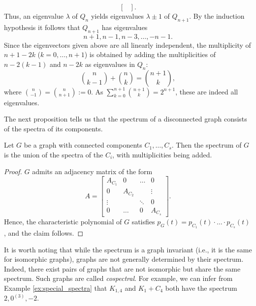 \begin{example}
\begin{enumerate}
\begin{equation*}
\begin{bmatrix}
                \end{bmatrix}.
            \end{equation*}
            Thus, an eigenvalue $\lambda$ of $Q_n$ yields eigenvalues $\lambda \pm 1$ of $Q_{n + 1}$.
            By the induction hypothesis it follows that $Q_{n + 1}$ has eigenvalues 
            \begin{equation*}
                n + 1, n - 1, n - 3, \dots, -n - 1.
            \end{equation*}
            Since the eigenvectors given above are all linearly independent, the multiplicity of $n + 1 - 2k$ ($k = 0, \dots, n + 1$) is obtained by adding the multiplicities of $n - 2(k - 1)$ and $n - 2k$ as eigenvalues in $Q_n$:
            \begin{equation*}
                \binom{n}{k - 1} + \binom{n}{k} = \binom{n + 1}{k},
            \end{equation*}
            where $\binom{n}{-1} = \binom{n}{n + 1} := 0$. As $\sum_{k = 0}^{n + 1} \binom{n + 1}{k} = 2^{n + 1}$, these are indeed all eigenvalues.
    \end{enumerate}
\end{example}

The next proposition tells us that the spectrum of a disconnected graph consists of the spectra of its components.
\begin{proposition}
    Let $G$ be a graph with connected components $C_1, \dots, C_s$. 
    Then the spectrum of $G$ is the union of the spectra of the $C_i$, with multiplicities being added.
\end{proposition}

\begin{proof}
    $G$ admits an adjacency matrix of the form
    \begin{equation*}
        A = \begin{bmatrix}
            A_{C_1} & 0 & \dots & 0 \\
            0 & A_{C_2} & & \vdots \\
            \vdots & & \ddots & 0 \\
            0 & \dots & 0 & A_{C_s}
        \end{bmatrix}.
    \end{equation*}
    Hence, the characteristic polynomial of $G$ satisfies $p_G (t) = p_{C_1} (t) \cdot \dots \cdot p_{C_s} (t)$, and the claim follows.
\end{proof}

It is worth noting that while the spectrum is a graph invariant (i.e., it is the same for isomorphic graphs), graphs are not generally determined by their spectrum.
Indeed, there exist pairs of graphs that are not isomorphic but share the same spectrum. Such graphs are called \textit{cospectral}. 
For example, we can infer from Example \ref{ex:special_spectra} that $K_{1, 4}$ and $K_1 + C_4$ both have the spectrum $2, 0^{(3)}, -2$.

